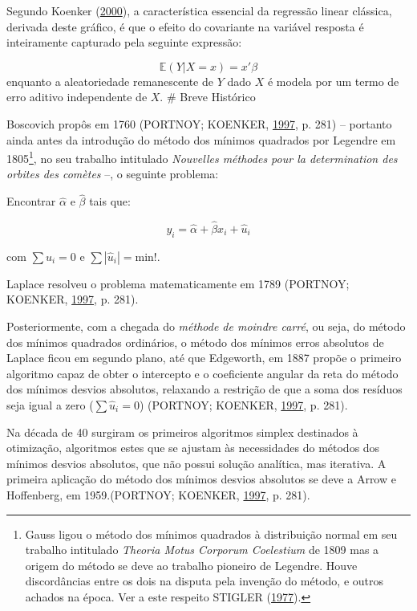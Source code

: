 \documentclass[a4paper, 12pt]{article}
\let\rmarkdownfootnote\footnote%
\def\footnote{\protect\rmarkdownfootnote}
\begin{document}
Segundo Koenker (\protect\hyperlink{ref-koenker2000}{2000}), a
característica essencial da regressão linear clássica, derivada deste
gráfico, é que o efeito do covariante na variável resposta é
inteiramente capturado pela seguinte expressão:

\[\mathbb{E}(Y|X = x) = x'\beta\] enquanto a aleatoriedade remanescente
de \(Y\) dado \(X\) é modela por um termo de erro aditivo independente
de \(X\). \# Breve Histórico

Boscovich propôs em 1760 (PORTNOY; KOENKER,
\protect\hyperlink{ref-tortoise}{1997}, p. 281) -- portanto ainda antes
da introdução do método dos mínimos quadrados por Legendre em
1805\footnote{Gauss ligou o método dos mínimos quadrados à distribuição
  normal em seu trabalho intitulado \emph{Theoria Motus Corporum
  Coelestium} de 1809 mas a origem do método se deve ao trabalho
  pioneiro de Legendre. Houve discordâncias entre os dois na disputa
  pela invenção do método, e outros achados na época. Ver a este
  respeito STIGLER (\protect\hyperlink{ref-STIGLER197731}{1977}).}, no
seu trabalho intitulado \emph{Nouvelles méthodes pour la determination
des orbites des comètes} --, o seguinte problema:

Encontrar \(\hat \alpha\) e \(\hat \beta\) tais que:

\[y_i = \hat \alpha + \hat \beta x_i + \hat u_i\]

com \(\sum \hat u_i = 0\) e \(\sum |\hat u_i| = \text{min!}\).

Laplace resolveu o problema matematicamente em 1789 (PORTNOY; KOENKER,
\protect\hyperlink{ref-tortoise}{1997}, p. 281).

Posteriormente, com a chegada do \emph{méthode de moindre carré}, ou
seja, do método dos mínimos quadrados ordinários, o método dos mínimos
erros absolutos de Laplace ficou em segundo plano, até que Edgeworth, em
1887 propõe o primeiro algoritmo capaz de obter o intercepto e o
coeficiente angular da reta do método dos mínimos desvios absolutos,
relaxando a restrição de que a soma dos resíduos seja igual a zero
(\(\sum \hat u_i = 0\)) (PORTNOY; KOENKER,
\protect\hyperlink{ref-tortoise}{1997}, p. 281).

Na década de 40 surgiram os primeiros algoritmos simplex destinados à
otimização, algoritmos estes que se ajustam às necessidades do métodos
dos mínimos desvios absolutos, que não possui solução analítica, mas
iterativa. A primeira aplicação do método dos mínimos desvios absolutos
se deve a Arrow e Hoffenberg, em 1959.(PORTNOY; KOENKER,
\protect\hyperlink{ref-tortoise}{1997}, p. 281).
\end{document}
